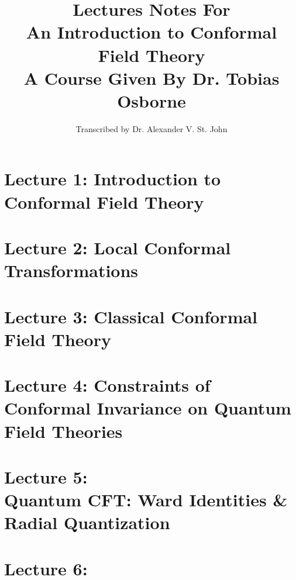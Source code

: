 \documentclass[10pt]{article}
\title{Lectures Notes For \\ An Introduction to Conformal Field Theory \\ A Course Given By Dr. Tobias Osborne}
\author{Transcribed by Dr. Alexander V. St. John}
\begin{document}
\maketitle

\clearpage

\section*{Lecture 1: Introduction to Conformal Field Theory}
\label{sec: lec1}



\clearpage

\section*{Lecture 2: Local Conformal Transformations}
\label{sec: lec2}



\clearpage

\section*{Lecture 3: Classical Conformal Field Theory}
\label{sec: lec3}



\clearpage

\section*{Lecture 4: Constraints of Conformal Invariance on Quantum Field Theories}
\label{sec: lec4}



\clearpage

\section*{Lecture 5: \\ Quantum CFT: Ward Identities \& Radial Quantization}
\label{sec: lec5}



\clearpage

\section*{Lecture 6: }
\label{sec: lec6}

%

\end{document}
